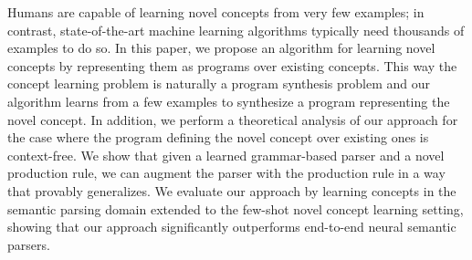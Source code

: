 Humans are capable of learning novel concepts from very few examples; in contrast, state-of-the-art machine learning algorithms typically need thousands of examples to do so. In this paper, we propose an algorithm for learning novel concepts by representing them as programs over existing concepts. This way the concept learning problem is naturally a program synthesis problem and our algorithm learns from a few examples to synthesize a program representing the novel concept. In addition, we perform a theoretical analysis of our approach for the case where the program defining the novel concept over existing ones is context-free. We show that given a learned grammar-based parser and a novel production rule, we can augment the parser with the production rule in a way that provably generalizes. We evaluate our approach by learning concepts in the semantic parsing domain extended to the few-shot novel concept learning setting, showing that our approach significantly outperforms end-to-end neural semantic parsers.
